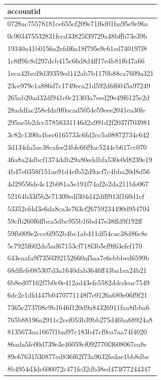 \begin{tabular}{l}
\toprule
accountid \\
\midrule
0728ac75578181ce655cf209e71f6d01ba95e9e96a \\
0c903475532831fecd33825f39729a48bffb73e39b \\
19340a41b0156a2efdf6a18f795e9c61ed740197f8 \\
1c8ff9fc8d297dcb415c66d8d4ff17e4b81f647a66 \\
1eca42bcd9d39359ed112ab7b1170b88ca7609a321 \\
23ce979e1a886d7c1749eca21d592d6f6045a97249 \\
265ab20ad32df941c0c21303a7eed29e49f6125e2d \\
28addfac258efda9f0acad5054e59eee2041ea30fe \\
295ae5b2dcc57858331146d2a991d2f2037f703981 \\
3c82c1390a4bec6165733c6fd2cc5a08872734c642 \\
3d134da5ac38cafee24bfe66f9ac5244cb617cc070 \\
46a8a24dbcf1374ddb29a80eddbfa530e0d8239e19 \\
4b47e0358f151ae91d4efb52d9acf7c4bba20d8d56 \\
4d29556de4c12b081a5e191f74af2e2da211bfe067 \\
52164b33f5b2e71309edf304d42dfff913f160d1cf \\
53352efdd3e6da8ca3e763cf26759234490d954704 \\
59cfb260f6ffbca5dbc955b16bd47e38ffd9f192ff \\
59fb009e2ccc6f952b4bc1ab411df54cac38d86c8e \\
5c7925f602de5ad67153cf718f3b5ef9f63efef170 \\
643eaafa9f7350392152660af5aa7e6ebbbed6599b \\
68dffefe085307d3a1640dab3646ff43ba1ea24b21 \\
6b8ed07162f7b0c0e412ad43efe5582ddcdeac7549 \\
6dc2e1dfd447b0470771148f7e9126a689e06f9f21 \\
7365c273708c9b1646f120d9a84326911faa8fbba6 \\
765b88196a2911c2cef053b39bb275d46ba68924a8 \\
8135673aa1667f1baf97c183b47cf9ea7aa74f4020 \\
86ada5fc00d739e3e46059cf092770f3608067ea8c \\
89c67631530877ed836f62f73a9632fedae1bb8dbe \\
8b4954d3dc606072c471fe32db38ed473f77244347 \\

\end{tabular}
